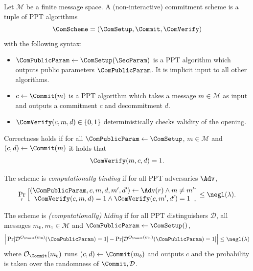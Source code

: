 \begin{definition}\label{def:commitment-scheme}
Let $\mathcal{M}$ be a finite message space. A (non-interactive) commitment scheme is a tuple of PPT algorithms
\[
  \ComScheme=(\ComSetup,\Commit,\ComVerify)
\]
with the following syntax:
\begin{itemize}[leftmargin=1.25em]
  \item $\ComPublicParam\gets \ComSetup(\SecParam)$ is a PPT algorithm which outputs public parameters $\ComPublicParam$. It is implicit input to all other algorithms.
  \item $c \gets \Commit(m)$ is a PPT algorithm which takes a message $m\in\mathcal{M}$ as input and outputs a commitment $c$ and decommitment $d$.
  \item $\ComVerify(c,m,d)\in\{0,1\}$ deterministically checks validity of the opening.
\end{itemize}
Correctness holds if for all $\ComPublicParam\gets \ComSetup$,  $m\in \mathcal{M}$ and $(c,d)\gets \Commit(m)$ it holds that
\[
  \ComVerify(m,c,d)=1.
\]

The scheme is \emph{computationally binding} if for all PPT adversaries $\Adv$,
\[
  \Pr_r\Big[\begin{matrix}
  	(\ComPublicParam,c,m,d,m',d')\gets \Adv(r) \wedge m\neq m' \\
  	 \ComVerify(c,m,d)=1 \wedge \ComVerify(c,m',d')=1 
  \end{matrix} 
   \Big]\le \negl(\lambda)\text{.}
\]

The scheme is \emph{(computationally) hiding} if for all PPT distinguishers $\mathcal{D}$, all 
messages $m_0,m_1\in\mathcal{M}$ and $\ComPublicParam\gets \ComSetup()$,
\[
  \Big|\Pr[\mathcal{D}^{\mathcal{O}_\Commit(m_0)}(\ComPublicParam)=1]
  -\Pr[\mathcal{D}^{\mathcal{O}_\Commit(m_1)}(\ComPublicParam)=1]\Big|\le \negl(\lambda)
\]
where $\mathcal{O}_{\Commit}(m_b)$ runs $(c,d)\gets \Commit(m_b)$ and outputs $c$ and the probability is taken over the randomness of $\Commit,\mathcal{D}$.
\end{definition}

